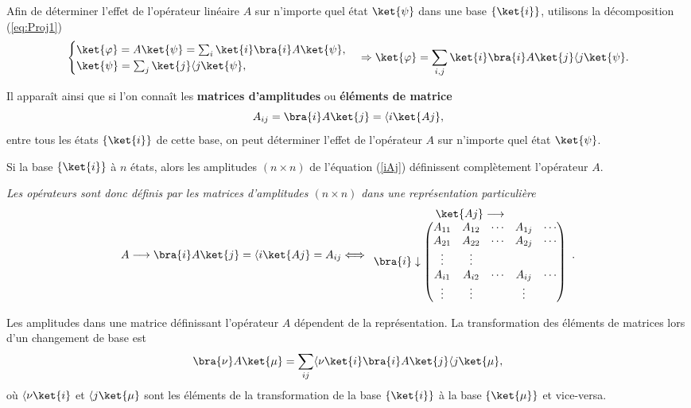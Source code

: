 Afin de déterminer l'effet de l'opérateur linéaire $A$ sur n'importe quel état
$\ket{\psi}$ dans une base $\{\ket{i}\}$, utilisons la décomposition
(\ref{eq:Proj1})
\begin{equation}
\begin{cases}
\ket{\varphi} =A\ket{\psi}=\sum_{i}\ket{i}\bra{i} A\ket{\psi},\\
\ket{\psi}=\sum_{j}\ket{j}\langle j\ket{\psi},
\end{cases}  \Rightarrow\ket{\varphi} =\sum_{i,j}\ket{i}\bra{i}A\ket{j}\langle
j\ket{\psi}. \label{Jii}%
\end{equation}

Il apparaît ainsi que si l'on connaît les \textbf{matrices d'amplitudes}
ou \textbf{éléments de matrice}%
\begin{equation}
A_{ij}=\bra{i} A\ket{j}=\langle i\ket{Aj},
\label{iAj}%
\end{equation}
entre tous les états $\{\ket{i}\}$ de cette base, on peut déterminer
l'effet de l'opérateur $A$ sur n'importe quel état $\ket{\psi}$.

Si la base $\{\ket{i}\}$ à $n$ états, alors les amplitudes $(n\times n)$ de
l'équation (\ref{iAj}) définissent complètement l'opérateur $A$.

\medskip\colorbox[gray]{0.8}{
\parbox[c]{0.9\textwidth}{
\emph{Les opérateurs sont donc définis par les matrices d'amplitudes $(n\times
n) $ dans une représentation particulière}%
\begin{equation}
A\longrightarrow\bra{i} A\ket{j} =\langle i\ket{Aj} =A_{ij}\Longleftrightarrow%
\begin{array}
[c]{c}%
\ket{Aj} \longrightarrow\\
\bra{i} \downarrow\begin{pmatrix}
A_{11} & A_{12} & \cdots & A_{1j} & \cdots\\
A_{21} & A_{22} & \cdots & A_{2j} & \cdots\\
\vdots & \vdots &  &  & \\
A_{i1} & A_{i2} & \cdots & A_{ij} & \cdots\\
\vdots & \vdots &  & \vdots &
\end{pmatrix}
\end{array}
.
\end{equation}
}}
\medskip

Les amplitudes dans une matrice définissant l'opérateur $A$ dépendent de la
représentation. La transformation des éléments de matrices lors d'un changement
de base est
\begin{equation}
\bra{\nu}A\ket{\mu} =\sum_{ij}\langle \nu\ket{i}\bra{i}A\ket{j}\langle j
\ket{\mu},
\end{equation}
où $\langle\nu\ket{i}$ et $\langle j\ket{\mu}$ sont les éléments de la
transformation de la base $\{\ket{i}\}$ à la base $\{\ket{\mu}\}$ et
vice-versa.

